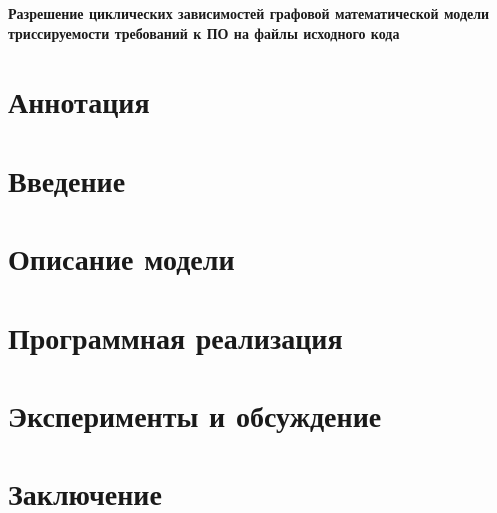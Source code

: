 \documentclass{article}
\begin{document}
    \begin{center}
    \Large
    \textbf{Разрешение циклических зависимостей графовой математической модели триссируемости требований к ПО на файлы исходного кода}



    \end{center}

    \section*{Аннотация}
    

    \section*{Введение}
    

    \section*{Описание модели}
    

    \section*{Программная реализация}
    

    \section*{Эксперименты и обсуждение}
    

    \section*{Заключение}
    
\end{document}
